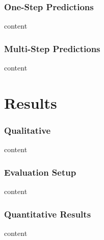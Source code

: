 \begin{frame}
    \frametitle{One-Step Predictions}

    content
\end{frame}

\begin{frame}
    \frametitle{Multi-Step Predictions}

    content
\end{frame}

\section{Results}
\begin{frame}
    \frametitle{Qualitative}

    content
\end{frame}

\begin{frame}
    \frametitle{Evaluation Setup}

    content
\end{frame}

\begin{frame}
    \frametitle{Quantitative Results}

    content
\end{frame}


